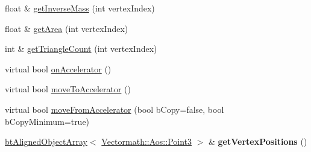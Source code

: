 \begin{DoxyCompactItemize}
\item 
float \& \hyperlink{classbtSoftBodyVertexData_af635ef3bb6d2b272f6b95d453bc05761}{get\+Inverse\+Mass} (int vertex\+Index)
\item 
float \& \hyperlink{classbtSoftBodyVertexData_aed372e4aa15c1101feabec4ea7fe80a2}{get\+Area} (int vertex\+Index)
\item 
int \& \hyperlink{classbtSoftBodyVertexData_a8c4f3283367407c593745929aaf7d639}{get\+Triangle\+Count} (int vertex\+Index)
\item 
virtual bool \hyperlink{classbtSoftBodyVertexData_a6512d196039f6445489a093ad18f7764}{on\+Accelerator} ()
\item 
virtual bool \hyperlink{classbtSoftBodyVertexData_a2d3f04a5b2461bf95beca6f3fc48e28b}{move\+To\+Accelerator} ()
\item 
virtual bool \hyperlink{classbtSoftBodyVertexData_aaa8ab4065ecf47a9c3b946b67b6c9f1b}{move\+From\+Accelerator} (bool b\+Copy=false, bool b\+Copy\+Minimum=true)
\item 
\mbox{\label{classbtSoftBodyVertexData_af168e43ddea128f820eaacba02ea4302}} 
\hyperlink{classbtAlignedObjectArray}{bt\+Aligned\+Object\+Array}$<$ \hyperlink{classVectormath_1_1Aos_1_1Point3}{Vectormath\+::\+Aos\+::\+Point3} $>$ \& {\bfseries get\+Vertex\+Positions} ()
\end{DoxyCompactItemize}
